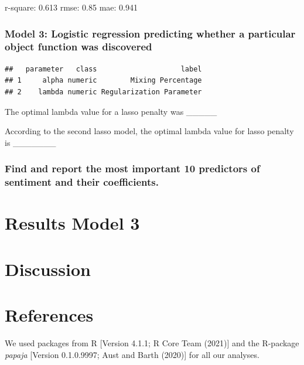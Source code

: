 \documentclass[
  english,
  man]{apa6}
\begin{document}
r-square: 0.613
rmse: 0.85
mae: 0.941

\hypertarget{model-3-logistic-regression-predicting-whether-a-particular-object-function-was-discovered}{%
\subsubsection{Model 3: Logistic regression predicting whether a particular object function was discovered}\label{model-3-logistic-regression-predicting-whether-a-particular-object-function-was-discovered}}

\begin{verbatim}
##   parameter   class                    label
## 1     alpha numeric        Mixing Percentage
## 2    lambda numeric Regularization Parameter
\end{verbatim}

The optimal lambda value for a lasso penalty was \_\_\_\_\_

According to the second lasso model, the optimal lambda value for lasso penalty is \_\_\_\_\_\_\_

\hypertarget{find-and-report-the-most-important-10-predictors-of-sentiment-and-their-coefficients.}{%
\subsubsection{Find and report the most important 10 predictors of sentiment and their coefficients.}\label{find-and-report-the-most-important-10-predictors-of-sentiment-and-their-coefficients.}}

\hypertarget{results-model-3}{%
\section{Results Model 3}\label{results-model-3}}

\hypertarget{discussion}{%
\section{Discussion}\label{discussion}}

\newpage

\hypertarget{references}{%
\section{References}\label{references}}

We used packages from R {[}Version 4.1.1; R Core Team (2021){]} and the R-package \emph{papaja} {[}Version 0.1.0.9997; Aust and Barth (2020){]} for all our analyses.
\end{document}

